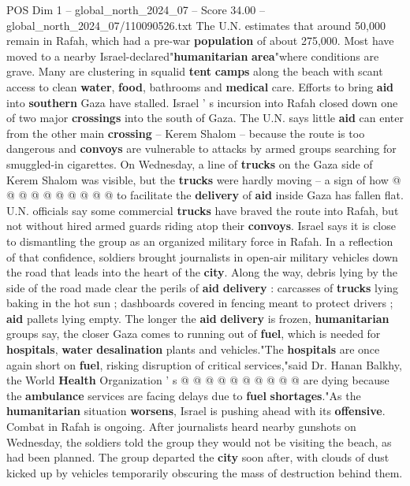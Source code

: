 \begin{textsample}{POS Dim 1 – global\_north\_2024\_07 – Score 34.00 – global\_north\_2024\_07/110090526.txt}
The U.N. estimates that around 50,000 remain in Rafah, which had a pre-war \textbf{population} of about 275,000.
Most have moved to a nearby Israel-declared"\textbf{humanitarian} \textbf{area}"where conditions are grave.
Many are clustering in squalid \textbf{tent} \textbf{camps} along the beach with scant access to clean \textbf{water}, \textbf{food}, bathrooms and \textbf{medical} care.
Efforts to bring \textbf{aid} into \textbf{southern} Gaza have stalled.
Israel ' s incursion into Rafah closed down one of two major \textbf{crossings} into the south of Gaza.
The U.N. says little \textbf{aid} can enter from the other main \textbf{crossing} -- Kerem Shalom -- because the route is too dangerous and \textbf{convoys} are vulnerable to attacks by armed groups searching for smuggled-in cigarettes.
On Wednesday, a line of \textbf{trucks} on the Gaza side of Kerem Shalom was visible, but the \textbf{trucks} were hardly moving -- a sign of how @ @ @ @ @ @ @ @ @ @ to facilitate the \textbf{delivery} of \textbf{aid} inside Gaza has fallen flat.
U.N. officials say some commercial \textbf{trucks} have braved the route into Rafah, but not without hired armed guards riding atop their \textbf{convoys}.
Israel says it is close to dismantling the group as an organized military force in Rafah.
In a reflection of that confidence, soldiers brought journalists in open-air military vehicles down the road that leads into the heart of the \textbf{city}.
Along the way, debris lying by the side of the road made clear the perils of \textbf{aid} \textbf{delivery} : carcasses of \textbf{trucks} lying baking in the hot sun ; dashboards covered in fencing meant to protect drivers ; \textbf{aid} pallets lying empty.
The longer the \textbf{aid} \textbf{delivery} is frozen, \textbf{humanitarian} groups say, the closer Gaza comes to running out of \textbf{fuel}, which is needed for \textbf{hospitals}, \textbf{water} \textbf{desalination} plants and vehicles."The \textbf{hospitals} are once again short on \textbf{fuel}, risking disruption of critical services,"said Dr.
Hanan Balkhy, the World \textbf{Health} Organization ' s @ @ @ @ @ @ @ @ @ @ are dying because the \textbf{ambulance} services are facing delays due to \textbf{fuel} \textbf{shortages}."As the \textbf{humanitarian} situation \textbf{worsens}, Israel is pushing ahead with its \textbf{offensive}.
Combat in Rafah is ongoing.
After journalists heard nearby gunshots on Wednesday, the soldiers told the group they would not be visiting the beach, as had been planned.
The group departed the \textbf{city} soon after, with clouds of dust kicked up by vehicles temporarily obscuring the mass of destruction behind them.

\end{textsample}
